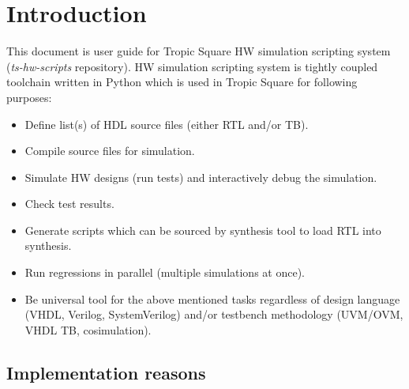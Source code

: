\documentclass{tropic_design_spec}
\begin{document}
\pagebreak
\tableofcontents



\pagebreak
\section{Introduction}

This document is user guide for Tropic Square HW simulation scripting system
(\textit{ts-hw-scripts} repository). HW simulation scripting system is tightly
coupled toolchain written in Python which is used in Tropic Square for
following purposes:

\begin{itemize}
	\item{Define list(s) of HDL source files (either RTL and/or TB).}
	\item{Compile source files for simulation.}
	\item{Simulate HW designs (run tests) and interactively debug the simulation.}
	\item{Check test results.}
	\item{Generate scripts which can be sourced by synthesis tool to load RTL into
          synthesis.}
    \item{Run regressions in parallel (multiple simulations at once).}
	\item{Be universal tool for the above mentioned tasks regardless of design
	      language (VHDL, Verilog, SystemVerilog) and/or testbench methodology
	      (UVM/OVM, VHDL TB, cosimulation).}
\end{itemize}

\subsection*{Implementation reasons}
\end{document}
